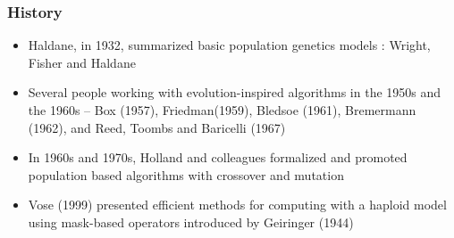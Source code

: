 \documentclass[pdf]{beamer}
\begin{document}
  
  
  \begin{frame}
    \frametitle{History}
    \begin{itemize}
      \item{Haldane, in 1932, summarized basic population genetics  models : Wright, Fisher and Haldane}
      \item{Several people working with evolution-inspired algorithms in the 1950s and the 1960s –  
      Box (1957), Friedman(1959), Bledsoe (1961), Bremermann (1962), and Reed, Toombs and Baricelli (1967) }
      \item{In 1960s and 1970s, Holland and colleagues formalized  and promoted population based algorithms with crossover and mutation }
      \item{Vose (1999) presented efficient methods for computing with a haploid model using mask-based operators introduced by Geiringer (1944)}
    \end{itemize}
  \end{frame}
  
\end{document}
